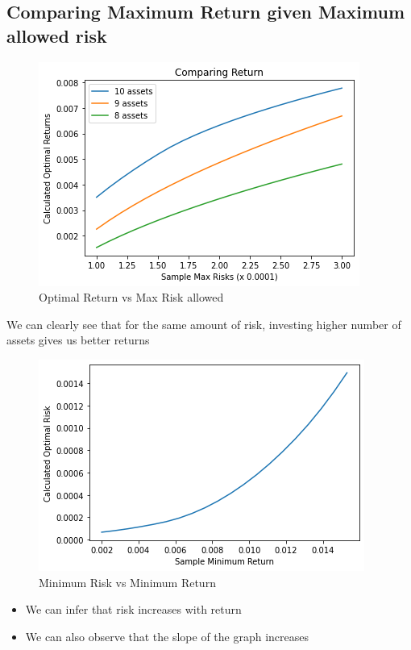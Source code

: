 \documentclass[conference]{IEEEtran}
\begin{document}
\subsection{Comparing Maximum Return given Maximum allowed risk}
    \begin{figure}[htbp]
    \centerline{\includegraphics[scale=0.55]{graphs/return_vs_risk.png}}
    \caption{Optimal Return vs Max Risk allowed}
    \label{fig}
    \end{figure}
    We can clearly see that for the same amount of risk, investing higher number of assets gives us better returns
    
    \begin{figure}[htbp]
    \centerline{\includegraphics[scale=0.55]{graphs/risk_vs_return.png}}
    \caption{Minimum Risk vs Minimum Return}
    \label{fig}
    \end{figure}
    
    \begin{itemize}
        \item  We can infer that risk increases with return
        
        \item  We can also observe that the slope of the graph increases
    \end{itemize}
    
\end{document}
